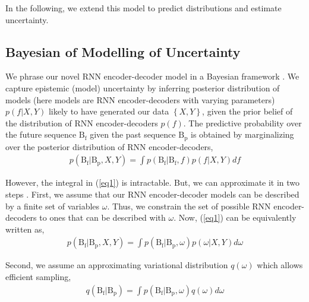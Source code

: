 In the following, we extend this model to predict distributions and estimate uncertainty.

\iffalse
We can obtain such a point estimate through a linear transformation of the hidden state of the decoder RNN.
\begin{align}\label{eq12}
    \begin{split}
        h_{\text{dec}}^{t+n} &= \text{RNN}_{\text{dec}}(h_{\text{dec}}^{t+n-1}, v_{bbox}) \\ 
        \hat{b}_{i}^{t+n} &= W_{bbox} * h_{\text{dec}}^{t+n} + bias_{bbox}.
    \end{split}
\end{align}
\fi


\subsection{Bayesian of Modelling of Uncertainty}\label{sec:uncertainty}
We phrase our novel RNN encoder-decoder model in a Bayesian framework \cite{kendall2017uncertainties}. We capture epistemic (model) uncertainty by inferring posterior distribution of models (here models are RNN encoder-decoders with varying parameters) $p(f | X,Y)$ likely to have generated our data $\left\{ X, Y\right\}$, given the prior belief of the distribution of RNN encoder-decoders $p(f)$. The predictive probability over the future sequence $\text{B}_{\text{f}}$ given the past sequence  $\text{B}_{\text{p}}$ is obtained by marginalizing over the posterior distribution of RNN encoder-decoders,
\begin{align}\label{eq1}
p(\text{B}_{\text{f}} | \text{B}_{\text{p}}, X, Y) = \int p(\text{B}_{\text{f}} | \text{B}_{\text{f}}, f) p(f | X, Y) df
\end{align}

However, the integral in (\ref{eq1}) is intractable. But, we can approximate it in two steps \cite{Gal2016Bayesian,gal2016theoretically,kendall2017uncertainties}. First, we assume that our RNN encoder-decoder models can be described by a finite set of variables $\omega$. Thus, we constrain the set of possible RNN encoder-decoders to ones that can be described with $\omega$. Now, (\ref{eq1}) can be equivalently written as, 
\begin{align}\label{eq2m1}
p(\text{B}_{\text{f}} | \text{B}_{\text{p}}, X, Y) = \int p(\text{B}_{\text{f}} | \text{B}_{\text{p}}, \omega) p(\omega | X, Y) d\omega
\end{align}

Second, we assume an approximating variational distribution $q(\omega)$ which allows efficient sampling,
\begin{align}\label{eq2}
q(\text{B}_{\text{f}} | \text{B}_{\text{p}}) = \int p(\text{B}_{\text{f}} | \text{B}_{\text{p}}, \omega) q(\omega) d\omega
\end{align}

